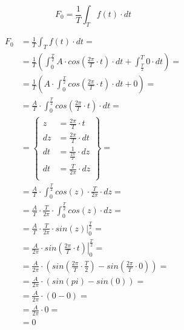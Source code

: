 \begin{task}

\begin{equation}
F_0=\frac{1}{T}\int_{T}f(t) \cdot dt
\end{equation}


\begin{align*}
F_0&=\frac{1}{T}\int_{T}f(t) \cdot dt=\\
&=\frac{1}{T}\left(\int_{0}^{\frac{T}{2}} A \cdot cos\left( \frac{2\pi}{T} \cdot t\right) \cdot dt + \int_{\frac{T}{2}}^{T} 0 \cdot dt\right)=\\
&=\frac{1}{T}\left(A \cdot \int_{0}^{\frac{T}{2}} cos\left( \frac{2\pi}{T} \cdot t\right) \cdot dt + 0\right)=\\
&=\frac{A}{T} \cdot \int_{0}^{\frac{T}{2}} cos\left( \frac{2\pi}{T} \cdot t\right) \cdot dt =\\
&=\begin{Bmatrix}
z&=\frac{2\pi}{T} \cdot t\\
dz&=\frac{2\pi}{T} \cdot dt\\
dt&=\frac{1}{\frac{2\pi}{T}} \cdot dz\\
dt&=\frac{T}{2\pi} \cdot dz\\
\end{Bmatrix}=\\
&=\frac{A}{T} \cdot \int_{0}^{\frac{T}{2}} cos\left(z\right) \cdot \frac{T}{2\pi} \cdot dz =\\
&=\frac{A}{T} \cdot \frac{T}{2\pi} \cdot \int_{0}^{\frac{T}{2}} cos\left(z\right)  \cdot dz =\\
&=\frac{A}{T} \cdot \frac{T}{2\pi} \cdot \left. sin\left(z\right)  \right|_{0}^{\frac{T}{2}} =\\
&=\frac{A}{2\pi} \cdot \left. sin\left(\frac{2\pi}{T} \cdot t\right)  \right|_{0}^{\frac{T}{2}} =\\
&=\frac{A}{2\pi} \cdot \left( sin\left(\frac{2\pi}{T} \cdot \frac{T}{2}\right) - sin\left(\frac{2\pi}{T} \cdot 0\right) \right) =\\
&=\frac{A}{2\pi} \cdot \left( sin\left(pi\right) - sin\left(0\right) \right) =\\
&=\frac{A}{2\pi} \cdot \left( 0 -0 \right) =\\
&=\frac{A}{2\pi} \cdot 0 =\\
&=0 
\end{align*}


\end{task}
